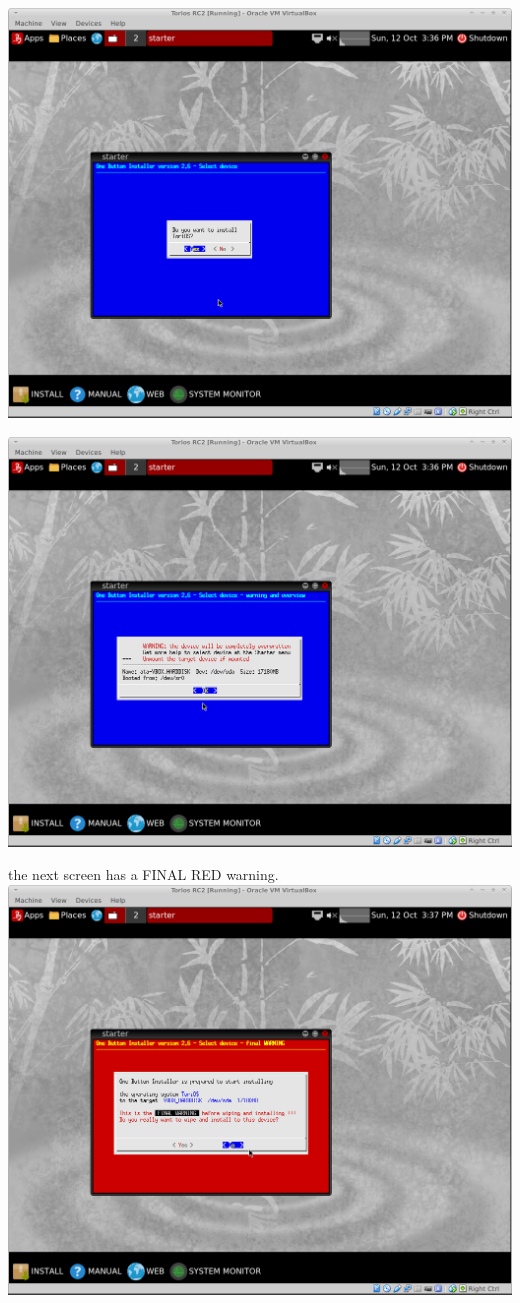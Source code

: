 \documentclass[12pt,a4paper]{book}
\begin{document}
\includegraphics[width=0.7\linewidth]{torios-rc2-install5}

\includegraphics[width=0.7\linewidth]{torios-rc2-install6}


the next screen has a FINAL RED warning. \\ 

\includegraphics[width=0.7\linewidth]{torios-rc2-install8-final-warning}
\end{document}

